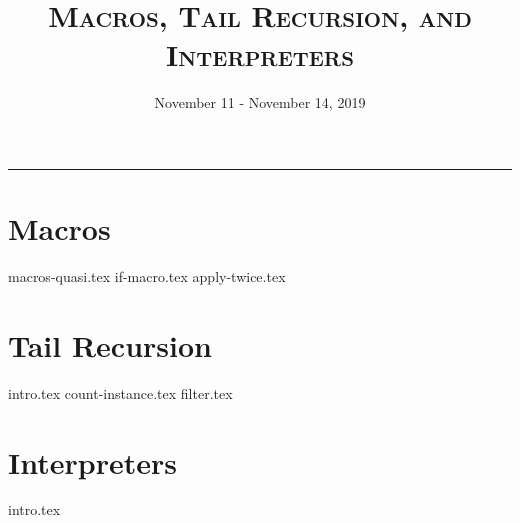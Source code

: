 \documentclass{exam}
\title{\textsc{Macros, Tail Recursion, and Interpreters}}
\date{November 11 - November 14, 2019}
\begin{document}
\maketitle
\rule{\textwidth}{0.15em}
\fontsize{12}{15}\selectfont





\section{Macros}
\begin{questions}
{macros-quasi.tex}
{if-macro.tex}
{apply-twice.tex}
\end{questions}

\section{Tail Recursion}
\begin{questions}
{intro.tex}
{count-instance.tex}
{filter.tex}
\end{questions}

\section{Interpreters}
\begin{questions}
{intro.tex}
\end{questions}

\end{document}
